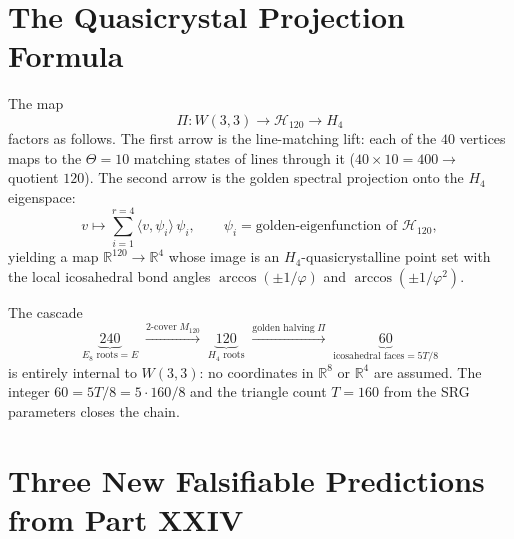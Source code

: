 \section{The Quasicrystal Projection Formula}
\label{sec:quasicrystal}

\begin{theorem}
\label{thm:qc_proj}
The map
\begin{equation}
  \Pi: W(3,3) \longrightarrow \mathcal{H}_{120} \longrightarrow H_4
  \label{eq:qc_chain}
\end{equation}
factors as follows.  The first arrow is the line-matching lift:
each of the $40$ vertices maps to the $\Theta=10$ matching states
of lines through it ($40\times 10=400\to$ quotient $120$).
The second arrow is the golden spectral projection onto the
$H_4$ eigenspace:
\begin{equation}
  v\mapsto \sum_{i=1}^{r=4} \langle v,\psi_i\rangle\,\psi_i,
  \qquad
  \psi_i = \text{golden-eigenfunction of }\mathcal{H}_{120},
  \label{eq:proj}
\end{equation}
yielding a map $\mathbb{R}^{120}\to\mathbb{R}^4$ whose image is
an $H_4$-quasicrystalline point set with the local icosahedral
bond angles $\arccos(\pm1/\varphi)$ and $\arccos(\pm1/\varphi^2)$.
\end{theorem}

\begin{corollary}
\label{cor:cascade}
The cascade
\begin{equation}
  \underbrace{240}_{E_8\text{ roots}=E}
  \;\xrightarrow{\text{2-cover}\;M_{120}}\;
  \underbrace{120}_{H_4\text{ roots}}
  \;\xrightarrow{\text{golden halving}\;\Pi}\;
  \underbrace{60}_{\text{icosahedral faces}=5T/8}
  \label{eq:cascade}
\end{equation}
is entirely internal to $W(3,3)$: no coordinates in $\mathbb{R}^8$
or $\mathbb{R}^4$ are assumed.  The integer $60 = 5T/8 = 5\cdot 160/8$
and the triangle count $T=160$ from the SRG parameters closes the chain.
\end{corollary}

\section{Three New Falsifiable Predictions from Part XXIV}
\label{sec:xxiv_predictions}


